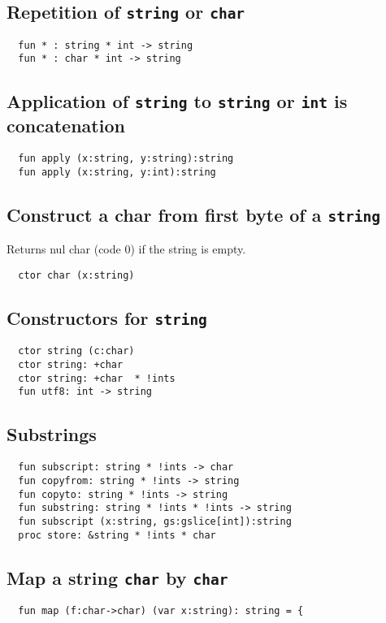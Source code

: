 \documentclass[oneside]{book}
\begin{document}
\subsection{Repetition of {\tt string} or {\tt char}}
\begin{verbatim}
  fun * : string * int -> string
  fun * : char * int -> string
\end{verbatim}

\subsection{Application of {\tt string} to {\tt string} or {\tt int} is concatenation}
\begin{verbatim}
  fun apply (x:string, y:string):string
  fun apply (x:string, y:int):string
\end{verbatim}

\subsection{Construct a char from first byte of a {\tt string}}
Returns nul char (code 0) if the string is empty.

\begin{verbatim}
  ctor char (x:string)
\end{verbatim}

\subsection{Constructors for {\tt string}}
\begin{verbatim}
  ctor string (c:char)
  ctor string: +char 
  ctor string: +char  * !ints
  fun utf8: int -> string
\end{verbatim}

\subsection{Substrings}
\begin{verbatim}
  fun subscript: string * !ints -> char
  fun copyfrom: string * !ints -> string
  fun copyto: string * !ints -> string
  fun substring: string * !ints * !ints -> string
  fun subscript (x:string, gs:gslice[int]):string
  proc store: &string * !ints * char
\end{verbatim}

\subsection{Map a string {\tt char} by {\tt char}}
\begin{verbatim}
  fun map (f:char->char) (var x:string): string = {
\end{verbatim}
\end{document}
